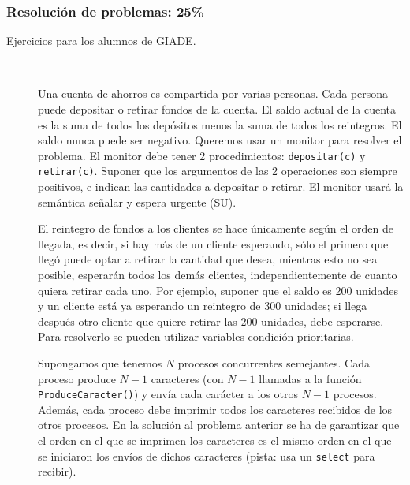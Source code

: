 \documentclass[12pt]{article}
\begin{document}
    \subsubsection*{Resolución de problemas: 25\%}
    \begin{description}
        \item [Ejercicios para los alumnos de GIADE.]~\\
            \begin{ejercicio}
                Una cuenta de ahorros es compartida por varias personas. Cada persona puede depositar o retirar fondos de la cuenta. El saldo actual de la cuenta es la suma de todos los depósitos menos la suma de todos los reintegros. El saldo nunca puede ser negativo. Queremos usar un monitor para resolver el problema. El monitor debe tener 2 procedimientos: \verb|depositar(c)| y \verb|retirar(c)|. Suponer que los argumentos de las 2 operaciones son siempre positivos, e indican las cantidades a depositar o retirar. El monitor usará la semántica señalar y espera urgente (SU).

                \noindent
                El reintegro de fondos a los clientes se hace únicamente según el orden de llegada, es decir, si hay más de un cliente esperando, sólo el primero que llegó puede optar a retirar la cantidad que desea, mientras esto no sea posible, esperarán todos los demás clientes, independientemente de cuanto quiera retirar cada uno. Por ejemplo, suponer que el saldo es 200 unidades y un cliente está ya esperando un reintegro de 300 unidades; si llega después otro cliente que quiere retirar las 200 unidades, debe esperarse. Para resolverlo se pueden utilizar variables condición prioritarias.
            \end{ejercicio}

            \begin{ejercicio}
                Supongamos que tenemos $N$ procesos concurrentes semejantes. Cada proceso produce $N-1$ caracteres (con $N-1$ llamadas a la función \verb|ProduceCaracter()|) y envía cada carácter a los otros $N-1$ procesos. Además, cada proceso debe imprimir todos los caracteres recibidos de los otros procesos. En la solución al problema anterior se ha de garantizar que el orden en el que se imprimen los caracteres es el mismo orden en el que se iniciaron los envíos de dichos caracteres (pista: usa un \verb|select| para recibir).
            \end{ejercicio}


\end{description}
\end{document}
